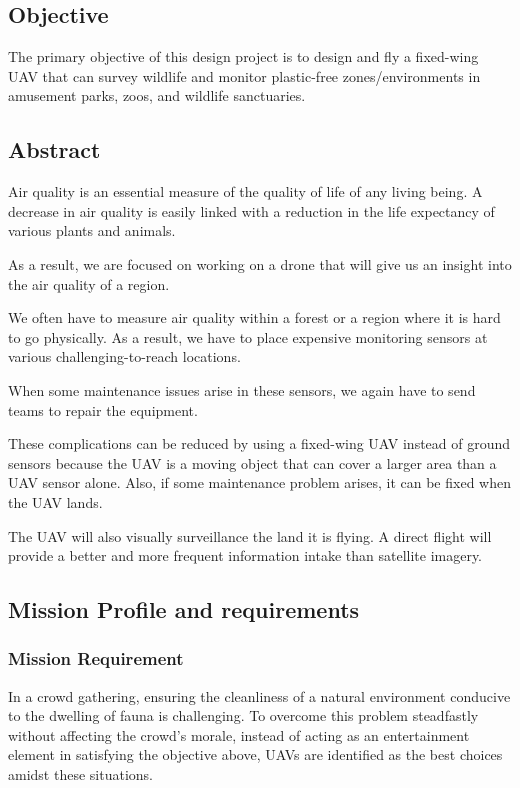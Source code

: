 \documentclass[12 pt]{article}
\begin{document}
\subsection{Objective}
The primary objective of this design project is to design and fly a fixed-wing UAV that can survey wildlife and monitor plastic-free zones/environments in amusement parks, zoos, and wildlife sanctuaries.


\subsection{Abstract}
Air quality is an essential measure of the quality of life of any living being. A decrease in air quality is easily linked with a reduction in the life expectancy of various plants and animals.

As a result, we are focused on working on a drone that will give us an insight into the air quality of a region. 

We often have to measure air quality within a forest or a region where it is hard to go physically. As a result, we have to place expensive monitoring sensors at various challenging-to-reach locations. 

When some maintenance issues arise in these sensors, we again have to send teams to repair the equipment.

These complications can be reduced by using a fixed-wing UAV instead of ground sensors because the UAV is a moving object that can cover a larger area than a UAV sensor alone. Also, if some maintenance problem arises, it can be fixed when the UAV lands.

The UAV will also visually surveillance the land it is flying. A direct flight will provide a better and more frequent information intake than satellite imagery.

\subsection{Mission Profile and requirements}

\subsubsection{Mission Requirement}
In a crowd gathering, ensuring the cleanliness of a natural environment conducive to the dwelling of fauna is challenging. To overcome this problem steadfastly without affecting the crowd's morale, instead of acting as an entertainment element in satisfying the objective above, UAVs are identified as the best choices amidst these situations. 
\end{document}
